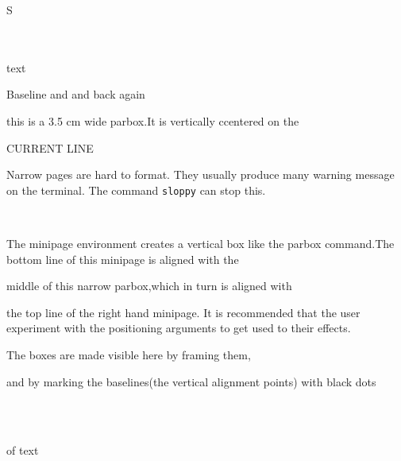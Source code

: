 \documentclass[12pt,twoside,a4paper]{article}   %
\begin{document}
	\makebox[0pt][l]{/}S\\
	\\	%
	\newsavebox{\boxname} %
	\usebox{\boxname}\\ %
	\begin{lrbox}{\boxname}
		text
	\end{lrbox} %
	Baseline \raisebox{1ex}{high} and \raisebox{-1ex}{low}
	and back again\\
	\parbox{3.5cm}{\sloppy this is a 3.5 cm wide parbox.It is vertically ccentered on the}
	\hfill CURRENT LINE \hfill
	\parbox{5.5cm}{Narrow pages are hard to format. They usually produce many warning message on the terminal. The command
	{\tt{}sloppy} can stop this.}\\
	\begin{minipage}[b]{4.3cm}
		The minipage environment creates a vertical box like the parbox command.The bottom line of this minipage is aligned with the
	\end{minipage}\hfill
	\parbox{3.0cm}{middle of this narrow parbox,which in turn is aligned with}
	\hfill
	\begin{minipage}[t]{3.8cm}
		the top line of the right hand minipage. It is recommended that the user experiment with the positioning arguments to get used to their effects.
	\end{minipage}
	\begin{minipage}[b]{8.5cm}
		\parbox[t]{4.3cm}{The boxes are made visible here by framing them,} \hfill
		\parbox[t]{3.0cm}{and by marking the baselines(the vertical alignment points) with black dots}\\
		\mbox{}\\	%
	\end{minipage}	
	of text\\
\end{document}
